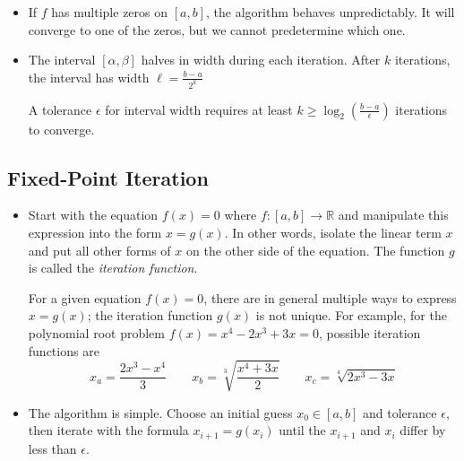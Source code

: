 \documentclass[11pt, a4paper]{article}
\newcommand{\R}{\mathbb{R}} %
\begin{document}
\begin{itemize}
\begin{itemize}
		\item If $ f $ has multiple zeros on $ [a, b] $, the algorithm behaves unpredictably. It will converge to one of the zeros, but we cannot predetermine which one.
		
		\item The interval $ [\alpha, \beta] $ halves in width during each iteration. After $ k $ iterations, the interval has width $ \ell = \frac{b-a}{2^{k}} $
		
		\smallskip 
		A tolerance $ \epsilon $ for interval width requires at least $ k \geq \log_{2}\left (\frac{b-a}{\epsilon}\right )  $ iterations to converge.
	\end{itemize}
	
\end{itemize}

\subsection{Fixed-Point Iteration}

\begin{itemize}
	\item Start with the equation $ f(x) = 0$ where $ f: [a, b] \to \R $ and manipulate this expression into the form $ x = g(x) $. In other words, isolate the linear term $ x $ and put all other forms of $ x $ on the other side of the equation. The function $ g $ is called the \textit{iteration function}. 

	For a given equation $ f(x) = 0 $, there are in general multiple ways to express $ x = g(x) $; the iteration function $ g(x) $ is not unique. For example, for the polynomial root problem $ f(x) = x^{4} - 2x^{3} + 3x = 0 $, possible iteration functions are
	\begin{equation*}
		x_{a} = \frac{2x^{3} - x^{4}}{3} \qquad x_{b} = \sqrt[3]{\frac{x^{4}+ 3x}{2}}\qquad x_{c} = \sqrt[4]{2x^{3} - 3x}
	\end{equation*}

	\item The algorithm is simple. Choose an initial guess $ x_0 \in [a, b]$ and tolerance $ \epsilon $, then iterate with the formula $ x_{i + 1} = g(x_{i}) $ until the $ x_{i+1} $ and $ x_{i} $ differ by less than $ \epsilon $.
\end{itemize}	
	
\end{document}
